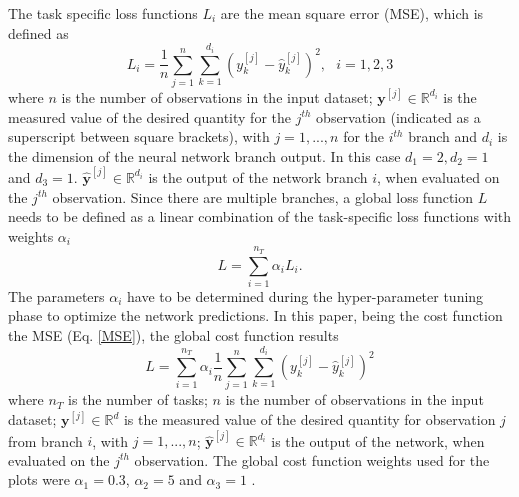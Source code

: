 \documentclass[9pt,twocolumn,twoside,pdftex]{optica}
\begin{document}
The task specific loss functions $L_i$ are the mean square error (MSE), which is defined as
\begin{equation}
L_i = \frac{1}{n} \sum_{j=1}^n \sum_{k=1}^{d_i} (y_k^{[j]}-\hat y_k^{[j]})^2, \ \ \ i=1,2,3
\label{MSE}
\end{equation}
where $n$ is the number of observations in the input dataset; ${\mathbold y}^{[j]} \in \mathbb{R}^{d_i}$ is the measured value of the desired quantity for the $j^{th}$ observation (indicated as a superscript between square brackets), with $j=1, ..., n$ for the $i^{th}$ branch and $d_i$ is the dimension of the neural network branch output. In this case $d_1=2, d_2=1$ and $d_3=1$. $ \hat {\mathbold y}^{[j]} \in \mathbb{R}^{d_i}$ is the output of the network branch $i$, when evaluated on the $j^{th}$ observation. Since there are multiple branches, a global loss function $L$ needs to be defined as a linear combination of the task-specific loss functions with weights $\alpha_i$ 
\begin{equation}
L = \sum_{i=1}^{n_T}\alpha_i L_i .
\label{globalcf}
\end{equation}
The parameters $\alpha_i$ have to be determined during the hyper-parameter tuning phase to optimize the network predictions.
In this paper, being the cost function the MSE (Eq. \ref{MSE}), the global cost function results
\begin{equation}
L = \sum_{i=1}^{n_T}\alpha_i \frac{1}{n} \sum_{j=1}^n \sum_{k=1}^{d_i} (y_k^{[j]}-\hat y_k^{[j]})^2
\end{equation}
where  $n_T$ is the number of tasks; $n$ is the number of observations in the input dataset; ${\mathbold y}^{[j]} \in \mathbb{R}^d$ is the measured value of the desired quantity for observation $j$ from branch $i$, with $j=1, ..., n$; $ \hat {\mathbold y}^{[j]} \in \mathbb{R}^{d_i}$ is the output of the network, when evaluated on the $j^{th}$ observation.
The global cost function weights used for the plots were $\alpha_1 = 0.3$, $\alpha_2 = 5$ and $\alpha_3 = 1$ \cite{Michelucci2019_2}.
 
\end{document}
